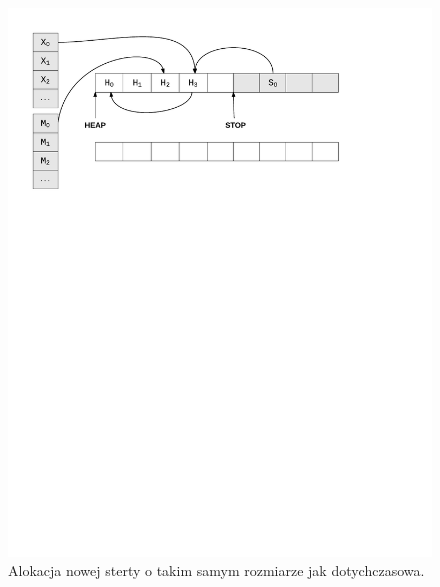 \begin{figure}[p]
\centerline{\includegraphics[scale=0.75, clip, trim=10mm 185mm 45mm 10mm]{gc_1}}
\caption{Alokacja nowej sterty o takim samym rozmiarze jak dotychczasowa.}
\label{fig:gc1}


\end{figure}
